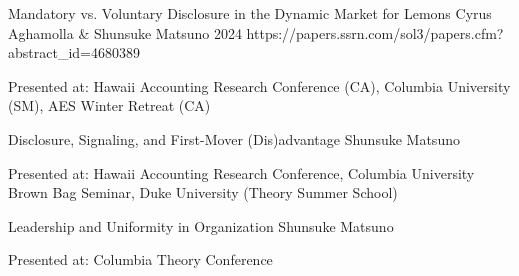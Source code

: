 


\paperentry
	{Mandatory vs. Voluntary Disclosure in the Dynamic Market for Lemons}   %
	{Cyrus Aghamolla \& Shunsuke Matsuno}   %
	{2024}   %
	{https://papers.ssrn.com/sol3/papers.cfm?abstract_id=4680389}  %
	{}   %
	{}   %
	{
	\begin{cvitems} %
		\item {Presented at: Hawaii Accounting Research Conference (CA), Columbia University (SM), AES Winter Retreat (CA)}
	\end{cvitems}
	}

\paperentry
	{Disclosure, Signaling, and First-Mover (Dis)advantage}
	{Shunsuke Matsuno}
	{}
	{}
	{}
	{}
	{
	\begin{cvitems} %
		\item {Presented at: Hawaii Accounting Research Conference, Columbia University Brown Bag Seminar, Duke University (Theory Summer School)}
	\end{cvitems}
	}

\vspace{.3cm}

\paperentry
	{Leadership and Uniformity in Organization}
	{Shunsuke Matsuno}
	{}
	{}
	{}
	{}
	{
	\begin{cvitems} %
		\item {Presented at: Columbia Theory Conference}
	\end{cvitems}
	}




	
